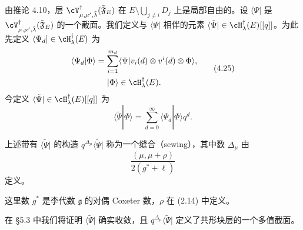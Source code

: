 由推论 4.10，层 $\cV^{\dagger}_{\mu,\mu',\tilde\lambda}(\tilde{\mathfrak F}_E)$ 在 $E\setminus\bigcup_{j\ne i}D_j$ 上是局部自由的。设 $\langle\Psi|$ 是 $\cV^{\dagger}_{\mu,\mu',\tilde\lambda}(\tilde{\mathfrak F}_E)$ 的一个截面。我们定义与 $\langle\Psi|$ 相伴的元素 $\langle\tilde\Psi|\in\cH^{\dagger}_\lambda(E)[[q]]$。为此先定义 $\langle\Psi_d|\in\cH^{\dagger}_\lambda(E)$ 为
\begin{equation}
 \begin{gathered}
 \langle\Psi_d|\Phi\rangle=\sum_{i=1}^{m_d}\langle\Psi|v_i(d)\otimes v^i(d)\otimes\Phi\rangle,\\
 |\Phi\rangle\in\cH^{\dagger}_\lambda(E).
 \end{gathered} \tag{4.25}
\end{equation}
今定义 $\langle\tilde\Psi|\in\cH^{\dagger}_\lambda(E)[[q]]$ 为
\begin{equation}
 \langle\tilde\Psi|\Phi\rangle=\sum_{d=0}^{\infty}\langle\Psi_d|\Phi\rangle q^d. \tag{4.26}
\end{equation}



\begin{definition}[4.15]
上述带有 $\langle\tilde\Psi|$ 的构造 $q^{\Delta_\mu}\langle\tilde\Psi|$ 称为一个缝合（sewing），其中数 $\Delta_\mu$ 由
\[
 \frac{(\mu,\mu+\rho)}{2(g^*+\ell)}
\]
定义。
\end{definition}

这里数 $g^*$ 是李代数 $\mathfrak g$ 的对偶 Coxeter 数，$\rho$ 在 (2.14) 中定义。


在 §5.3 中我们将证明 $\langle\tilde\Psi|$ 确实收敛，且 $q^{\Delta_\mu}\langle\tilde\Psi|$ 定义了共形块层的一个多值截面。

